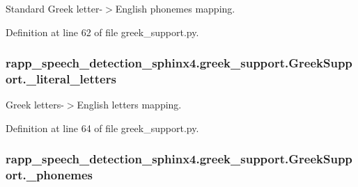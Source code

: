 Standard Greek letter-\/$>$English phonemes mapping. 



Definition at line 62 of file greek\-\_\-support.\-py.

\hypertarget{classrapp__speech__detection__sphinx4_1_1greek__support_1_1GreekSupport_a553a5e8b07dc6b3b9b83a2f814535204}{
\subsubsection[{\-\_\-literal\-\_\-letters}]{\setlength{\rightskip}{0pt plus 5cm}rapp\-\_\-speech\-\_\-detection\-\_\-sphinx4.\-greek\-\_\-support.\-Greek\-Support.\-\_\-literal\-\_\-letters\hspace{0.3cm}{\ttfamily [private]}}}\label{classrapp__speech__detection__sphinx4_1_1greek__support_1_1GreekSupport_a553a5e8b07dc6b3b9b83a2f814535204}


Greek letters-\/$>$English letters mapping. 



Definition at line 64 of file greek\-\_\-support.\-py.

\hypertarget{classrapp__speech__detection__sphinx4_1_1greek__support_1_1GreekSupport_ac660aeb52c669c9e0bd81d9cac50c3d6}{
\subsubsection[{\-\_\-phonemes}]{\setlength{\rightskip}{0pt plus 5cm}rapp\-\_\-speech\-\_\-detection\-\_\-sphinx4.\-greek\-\_\-support.\-Greek\-Support.\-\_\-phonemes\hspace{0.3cm}{\ttfamily [private]}}}\label{classrapp__speech__detection__sphinx4_1_1greek__support_1_1GreekSupport_ac660aeb52c669c9e0bd81d9cac50c3d6}


